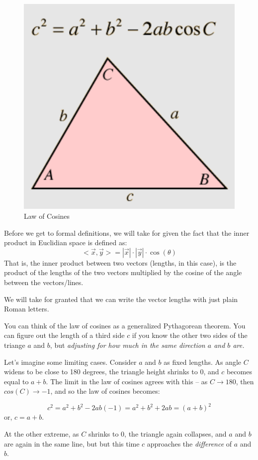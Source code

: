 \documentclass[
]{book}
\begin{document}
\begin{figure}

{\centering \includegraphics[width=0.5\linewidth,height=0.5\textheight]{images/law-of-cosines} 

}

\caption{Law of Cosines}\label{fig:unnamed-chunk-6}
\end{figure}

Before we get to formal definitions, we will take for given the fact that the inner product in Euclidian space is defined as:
\[<\vec{x},\vec{y}> = |\vec{x}| \cdot |\vec{y}| \cdot \cos(\theta)\]
That is, the inner product between two vectors (lengths, in this case), is the product of the lengths of the two vectors multiplied by the cosine of the angle between the vectors/lines.

We will take for granted that we can write the vector lengths with just plain Roman letters.

You can think of the law of cosines as a generalized Pythagorean theorem. You can figure out the length of a third side \(c\) if you know the other two sides of the triange \(a\) and \(b\), but \emph{adjusting for how much in the same direction \(a\) and \(b\) are.}

Let's imagine some limiting cases. Consider \(a\) and \(b\) as fixed lengths. As angle \(C\) widens to be close to 180 degrees, the triangle height shrinks to 0, and \(c\) becomes equal to \(a + b\). The limit in the law of cosines agrees with this -- as \(C \rightarrow 180\), then \(cos(C) \rightarrow -1\), and so the law of cosines becomes:

\[c^2 = a^2 + b^2 - 2 a b (-1) = a^2 + b^2 + 2 a b = (a + b)^2\]
or, \(c = a + b\).

At the other extreme, as \(C\) shrinks to 0, the triangle again collapses, and \(a\) and \(b\) are again in the same line, but but this time \(c\) approaches the \emph{difference} of \(a\) and \(b\).
\end{document}
